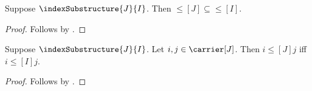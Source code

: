 \begin{corollary}\label{index_substructure_order_subseteq}
    Suppose $\indexSubstructure{J}{I}$.
    Then $\leq[J]\subseteq\leq[I]$.
\end{corollary}
\begin{proof}
    Follows by
        .
\end{proof}

\begin{proposition}\label{index_substructure_order_iff}
    Suppose $\indexSubstructure{J}{I}$.
    Let $i,j\in\carrier[J]$.
    Then $i\mathrel{\leq[J]}j$ iff $i\mathrel{\leq[I]}j$.
\end{proposition}
\begin{proof}
    Follows by
        .
\end{proof}

